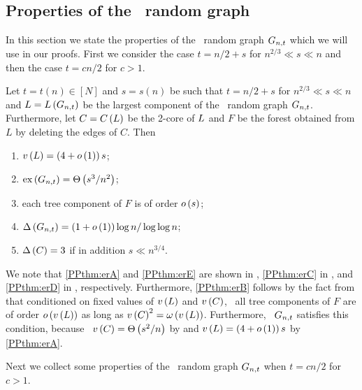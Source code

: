 \subsection{Properties of the \ER\ random graph}
In this section we state the properties of the \ER\ random graph $G_{n,t}$ which we will use in our proofs. First we consider the case $t=n/2+s$ for $n^{2/3}\ll s\ll n$ and then the case $t=cn/2$ for $c>1$.
\begin{thm}\label{PPthm:er}
	Let $t=t(n)\in\left[N\right]$ and $s=s(n)$ be such that $t=n/2+s$ for $n^{2/3}\ll s\ll n$ and $L=L\left(G_{n,t}\right)$ be the largest component of the \ER\ random graph $G_{n,t}$. Furthermore, let $C=C\left(L\right)$ be the 2-core of $L$ and $F$ be the forest obtained from $L$ by deleting the edges of $C$. Then \whp
	\begin{enumerate}
		\item\label{PPthm:erA}
		$v\left({L}\right)=\left(4+o\left(1\right)\right)s$;
		\item\label{PPthm:erE}
		$\operatorname{ex}\left(G_{n,t}\right)=\Theta\left(s^3/n^2\right)$;
		\item\label{PPthm:erB}
		each tree component of $F$ is of order $o\left(s\right)$;
		\item\label{PPthm:erC}
		$\Delta\left(G_{n,t}\right)=\left(1+o\left(1\right)\right)\log n/\log\log n$;
		\item\label{PPthm:erD}
		$\Delta\left(C\right)=3$ if in addition $s\ll n^{3/4}$.
	\end{enumerate}
\end{thm}

We note that \ref{PPthm:erA} and \ref{PPthm:erE} are shown in \cite{Luczak1990}, \ref{PPthm:erC} in \cite{Bollobas1982}, and \ref{PPthm:erD} in \cite{Luczak1991b}, respectively. Furthermore, \ref{PPthm:erB} follows by the fact from \cite{Pavlov1977} that conditioned on fixed values of $v\left({L}\right)$ and $v\left({C}\right)$, \whp\ all tree components of $F$ are of order $o\left(v\left({L}\right)\right)$ as long as $v\left({C}\right)^2=\omega\left(v\left({L}\right)\right)$. Furthermore, \whp\ $G_{n,t}$ satisfies this condition, because \whp\ $v\left({C}\right)=\Theta\left(s^2/n\right)$ by \cite{Luczak1991b} and $v\left({L}\right)=\left(4+o\left(1\right)\right)s$ by \ref{PPthm:erA}.

Next we collect some properties of the \ER\ random graph $G_{n,t}$ when $t=cn/2$ for $c>1$.


